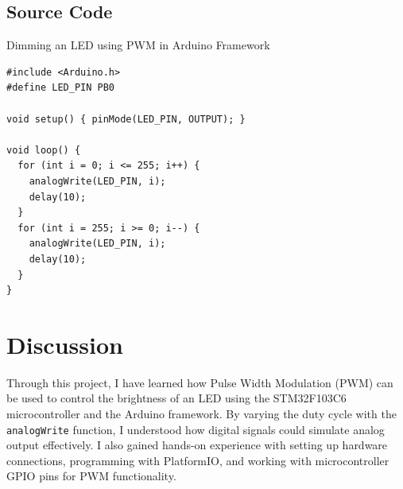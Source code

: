 \subsection{Source Code}
\begin{code}
\caption{Dimming an LED using PWM in Arduino Framework}
\begin{verbatim}
#include <Arduino.h>
#define LED_PIN PB0

void setup() { pinMode(LED_PIN, OUTPUT); }

void loop() {
  for (int i = 0; i <= 255; i++) {
    analogWrite(LED_PIN, i);
    delay(10);
  }
  for (int i = 255; i >= 0; i--) {
    analogWrite(LED_PIN, i);
    delay(10);
  }
}
\end{verbatim}
    \label{code:Pushbutton}
\end{code}

\section{Discussion}
Through this project, I have learned how Pulse Width Modulation (PWM) can be used
to control the brightness of an LED using the STM32F103C6 microcontroller
and the Arduino framework. By varying the duty cycle with the 
\texttt{analogWrite} function,
I understood how digital signals could simulate analog output effectively.
I also gained hands-on experience with setting up hardware connections,
programming with PlatformIO, and working with microcontroller GPIO pins for PWM functionality.
